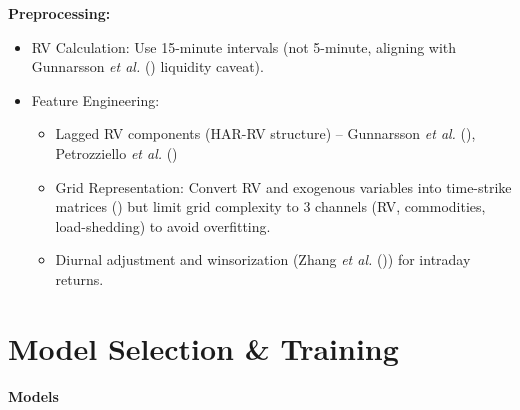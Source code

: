 \documentclass[11pt,preprint]{elsarticle}
\numberwithin{equation}{section}
\numberwithin{figure}{section}
\numberwithin{table}{section}
\def\tightlist{} %
\begin{document}
\textbf{Preprocessing:}

\begin{itemize}
\tightlist
\item
  RV Calculation: Use 15-minute intervals (not 5-minute, aligning with
  Gunnarsson \emph{et al.} ()
  liquidity caveat).\\
\item
  Feature Engineering:

  \begin{itemize}
  \tightlist
  \item
    Lagged RV components (HAR-RV structure) -- Gunnarsson \emph{et al.}
    (), Petrozziello \emph{et
    al.} ()
  \item
    Grid Representation: Convert RV and exogenous variables into
    time-strike matrices () but limit grid complexity to 3 channels (RV,
    commodities, load-shedding) to avoid overfitting.\\
  \item
    Diurnal adjustment and winsorization (Zhang \emph{et al.}
    ()) for intraday returns.
  \end{itemize}
\end{itemize}

\section{Model Selection \& Training}\label{model-selection-training}

\textbf{Models}
\end{document}
